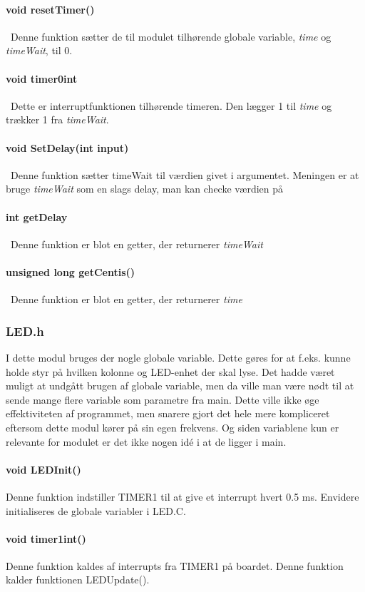 \paragraph{void resetTimer()}\
Denne funktion sætter de til modulet tilhørende globale variable, \textit{time} og \textit{timeWait}, til 0.
\paragraph{void timer0int}\
Dette er interruptfunktionen tilhørende timeren. Den lægger 1 til \textit{time} og trækker 1 fra \textit{timeWait}. 
\paragraph{void SetDelay(int input)}\
Denne funktion sætter timeWait til værdien givet i argumentet. Meningen er at bruge \textit{timeWait} som en slags delay, man kan checke værdien på
\paragraph{int getDelay}\
Denne funktion er blot en getter, der returnerer \textit{timeWait}
\paragraph{unsigned long getCentis()}\
Denne funktion er blot en getter, der returnerer \textit{time}
\subsubsection{LED.h}
I dette modul bruges der nogle globale variable. Dette gøres for at f.eks. kunne holde styr på hvilken kolonne og LED-enhet der skal lyse. Det hadde været muligt at undgått brugen af globale variable, men da ville man være nødt til at sende mange flere variable som parametre fra main. Dette ville ikke øge effektiviteten af programmet, men snarere gjort det hele mere kompliceret eftersom dette modul kører på sin egen frekvens. Og siden variablene kun er relevante for modulet er det ikke nogen idé i at de ligger i main.

\paragraph{void LEDInit()}
Denne funktion indstiller TIMER1 til at give et interrupt hvert 0.5 ms. Envidere initialiseres de globale variabler i LED.C.

\paragraph{void timer1int()}
Denne funktion kaldes af interrupts fra TIMER1 på boardet. Denne funktion kalder funktionen LEDUpdate().

